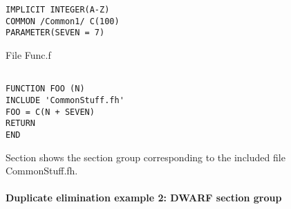 \begin{lstlisting}
IMPLICIT INTEGER(A-Z)
COMMON /Common1/ C(100)
PARAMETER(SEVEN = 7)
\end{lstlisting}

File Func.f
\begin{lstlisting}

FUNCTION FOO (N)
INCLUDE 'CommonStuff.fh'
FOO = C(N + SEVEN)
RETURN
END
\end{lstlisting}


Section 
shows the section group 
corresponding to the included file CommonStuff.fh.

\paragraph{Duplicate elimination example 2: DWARF section group}
\label{app:duplicateeliminationexample2dwarfsectiongroup}

